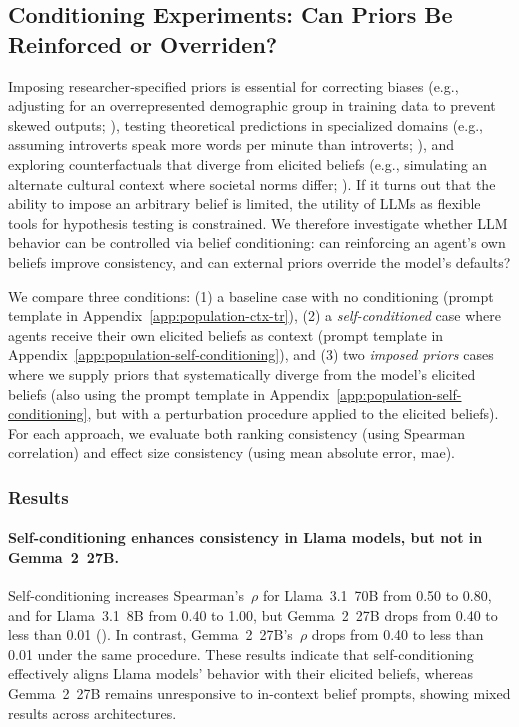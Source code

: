 \documentclass{article} %
\begin{document}
\subsection{Conditioning Experiments: Can Priors Be Reinforced or Overriden?}
\label{sec:conditioning}

Imposing researcher‐specified priors is essential for correcting biases (e.g., adjusting for an overrepresented demographic group in training data to prevent skewed outputs; \citealp{wang2025limits}), testing theoretical predictions in specialized domains (e.g., assuming introverts speak more words per minute than introverts; \citealp{argyle2023out}), and exploring counterfactuals that diverge from elicited beliefs (e.g., simulating an alternate cultural context where societal norms differ; \citealp{zhang2025law}). If it turns out that the ability to impose an arbitrary belief is limited, the utility of LLMs as flexible tools for hypothesis testing is constrained. We therefore investigate whether LLM behavior can be controlled via belief conditioning: can reinforcing an agent's own beliefs improve consistency, and can external priors override the model's defaults?

We compare three conditions: (1) a baseline case with no conditioning (prompt template in Appendix~\ref{app:population-ctx-tr}), (2) a \textit{self-conditioned} case where agents receive their own elicited beliefs as context (prompt template in Appendix~\ref{app:population-self-conditioning}), and (3) two \textit{imposed priors} cases where we supply priors that systematically diverge from the model's elicited beliefs (also using the prompt template in Appendix~\ref{app:population-self-conditioning}, but with a perturbation procedure applied to the elicited beliefs). For each approach, we evaluate both ranking consistency (using Spearman correlation) and effect size consistency (using mean absolute error, \gls{mae}).




\subsubsection{Results}
\paragraph{Self-conditioning enhances consistency in Llama models, but not in Gemma~2~27B.}
Self-conditioning increases Spearman's~$\rho$ for Llama~3.1~70B from 0.50 to 0.80, and for Llama~3.1~8B from 0.40 to 1.00, but Gemma~2~27B drops from 0.40 to less than 0.01 (). In contrast, Gemma~2~27B’s~$\rho$ drops from 0.40 to less than 0.01 under the same procedure. These results indicate that self-conditioning effectively aligns Llama models' behavior with their elicited beliefs, whereas Gemma~2~27B remains unresponsive to in-context belief prompts, showing mixed results across architectures.
\end{document}
